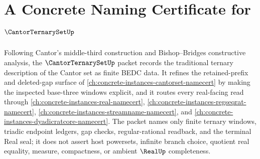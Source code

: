 \chapter{A Concrete Naming Certificate for $\CantorTernarySetUp$}
\label{ch:concrete-instances-cantor-ternary-set-namecert}

Following Cantor's middle-third construction and Bishop--Bridges constructive analysis, the $\CantorTernarySetUp$ packet records the traditional ternary description of the Cantor set as finite BEDC data. It refines the retained-prefix and deleted-gap surface of \autoref{ch:concrete-instances-cantorset-namecert} by making the inspected base-three windows explicit, and it routes every real-facing read through \autoref{ch:concrete-instances-real-namecert}, \autoref{ch:concrete-instances-regseqrat-namecert}, \autoref{ch:concrete-instances-streamname-namecert}, and \autoref{ch:concrete-instances-dyadicratcore-namecert}. The packet names only finite ternary windows, triadic endpoint ledgers, gap checks, regular-rational readback, and the terminal Real seal; it does not assert host powersets, infinite branch choice, quotient real equality, measure, compactness, or ambient $\RealUp$ completeness.

